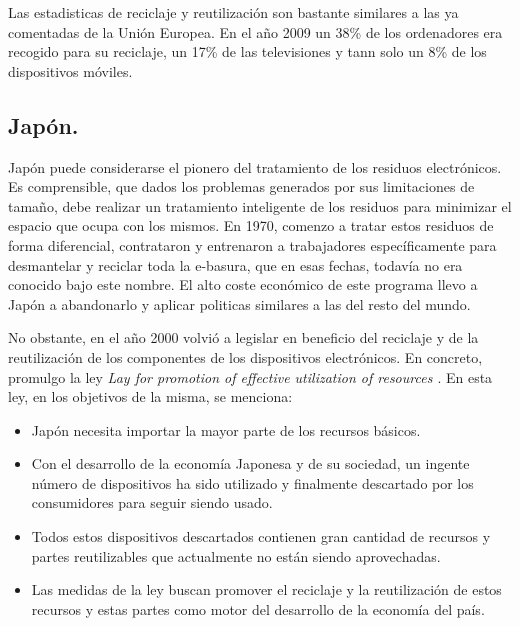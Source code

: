 Las estadisticas de reciclaje y reutilización \cite{epa-statistics} son bastante similares a las ya comentadas de la Unión Europea. En el año 2009 un 38\% de los ordenadores era recogido para su reciclaje, un 17\% de las televisiones y tann solo un 8\% de los dispositivos móviles.

\subsection{Japón.}

Japón puede considerarse el pionero del tratamiento de los residuos electrónicos. Es comprensible, que dados los problemas generados por sus limitaciones de tamaño, debe realizar un tratamiento inteligente de los residuos para minimizar el espacio que ocupa con los mismos. En 1970, comenzo a tratar estos residuos de forma diferencial, contrataron y entrenaron a trabajadores específicamente para desmantelar y reciclar toda la e-basura, que en esas fechas, todavía no era conocido bajo este nombre. El alto coste económico de este programa llevo a Japón a abandonarlo y aplicar politicas similares a las del resto del mundo.

No obstante, en el año 2000 volvió a legislar en beneficio del reciclaje y de la reutilización de los componentes de los dispositivos electrónicos. En concreto, promulgo la ley \emph{Lay for promotion of effective utilization of resources \cite{LPEUR}} . En esta ley, en los objetivos de la misma, se menciona:

\begin{itemize}

\item{Japón necesita importar la mayor parte de los recursos básicos.}

\item{Con el desarrollo de la economía Japonesa y de su sociedad, un ingente número de dispositivos ha sido utilizado y finalmente descartado por los consumidores para seguir siendo usado.}

\item{Todos estos dispositivos descartados contienen gran cantidad de recursos y partes reutilizables que actualmente no están siendo aprovechadas.}

\item{Las medidas de la ley buscan promover el reciclaje y la reutilización de estos recursos y estas partes como motor del desarrollo de la economía del país}.

\end{itemize}

